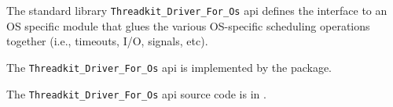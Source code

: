 
The standard library {\tt Threadkit\_Driver\_For\_Os} api defines 
the interface to an OS specific module that glues the various 
OS-specific scheduling operations together (i.e., timeouts, I/O, signals, etc).

The {\tt Threadkit\_Driver\_For\_Os} api is implemented by the  package.

The {\tt Threadkit\_Driver\_For\_Os} api source code is in .




